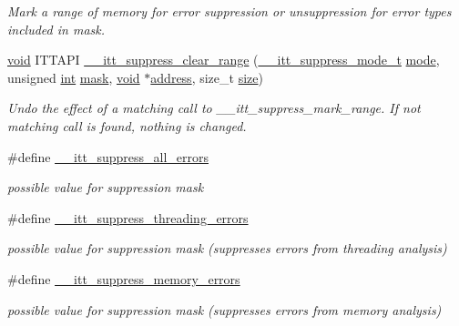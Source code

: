 \begin{DoxyCompactItemize}
\begin{DoxyCompactList}\small\item\em Mark a range of memory for error suppression or unsuppression for error types included in mask. \end{DoxyCompactList}\item 
\hyperlink{ittnotify__static_8h_af941d56e55e3c5465135b60c4d6343ed}{void} I\-T\-T\-A\-P\-I \hyperlink{group__suppress_gacfd9cea63c4b07bb44215785ec882583}{\-\_\-\-\_\-itt\-\_\-suppress\-\_\-clear\-\_\-range} (\hyperlink{group__suppress_ga63fa4a192bd1e53599c2e58fe4527b5a}{\-\_\-\-\_\-itt\-\_\-suppress\-\_\-mode\-\_\-t} \hyperlink{ittnotify__static_8h_aaa96ee29dca0e28ad6edad4c36f62080}{mode}, unsigned \hyperlink{ittnotify__static_8h_a8b8dcd723308a8cb5d84277c7a3fff70}{int} \hyperlink{ittnotify__static_8h_aa2c7de905e06240a7170f2a0da3a5abf}{mask}, \hyperlink{ittnotify__static_8h_af941d56e55e3c5465135b60c4d6343ed}{void} $\ast$\hyperlink{ittnotify__static_8h_a1021b0467711f8c9fbede1314244a832}{address}, size\-\_\-t \hyperlink{ittnotify__static_8h_a5a1daa0c1d342747e3884fa54fc64fb1}{size})
\begin{DoxyCompactList}\small\item\em Undo the effect of a matching call to \-\_\-\-\_\-itt\-\_\-suppress\-\_\-mark\-\_\-range. If not matching call is found, nothing is changed. \end{DoxyCompactList}\item 
\#define \hyperlink{group__suppress_ga3900b5fa67bc34ea6d9cd9f13626c7a8}{\-\_\-\-\_\-itt\-\_\-suppress\-\_\-all\-\_\-errors}
\begin{DoxyCompactList}\small\item\em possible value for suppression mask \end{DoxyCompactList}\item 
\#define \hyperlink{group__suppress_gaef282c38d1dd1bdd62faa58a59936f34}{\-\_\-\-\_\-itt\-\_\-suppress\-\_\-threading\-\_\-errors}
\begin{DoxyCompactList}\small\item\em possible value for suppression mask (suppresses errors from threading analysis) \end{DoxyCompactList}\item 
\#define \hyperlink{group__suppress_gacb8880266f3c9716e202a9a6b1e0fa63}{\-\_\-\-\_\-itt\-\_\-suppress\-\_\-memory\-\_\-errors}
\begin{DoxyCompactList}\small\item\em possible value for suppression mask (suppresses errors from memory analysis) \end{DoxyCompactList}\end{DoxyCompactItemize}



